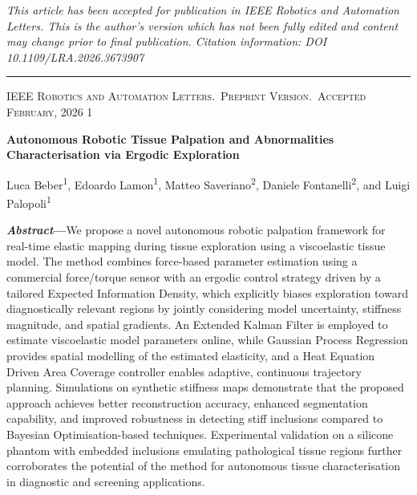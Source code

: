 \documentclass[11pt]{article}
\begin{document}
\begin{center}
{\footnotesize\itshape
This article has been accepted for publication in IEEE Robotics and
Automation Letters. This is the author's version which has not been
fully edited and content may change prior to final publication.
Citation information: DOI 10.1109/LRA.2026.3673907\par}
\end{center}

\vspace{0.4em}
\hrule
\vspace{0.6em}

\noindent
{\footnotesize\scshape IEEE Robotics and Automation Letters.\ Preprint Version.\ Accepted February, 2026 \hfill 1}

\vspace{1.2em}

\begin{center}
{\LARGE\bfseries
Autonomous Robotic Tissue Palpation and Abnormalities\\
Characterisation via Ergodic Exploration\par}
\end{center}

\vspace{0.6em}

\begin{center}
Luca Beber\textsuperscript{1},
Edoardo Lamon\textsuperscript{1},
Matteo Saveriano\textsuperscript{2},
Daniele Fontanelli\textsuperscript{2},
and Luigi Palopoli\textsuperscript{1}
\end{center}

\vspace{1em}

\noindent
\textbf{\textit{Abstract}---}We propose a novel autonomous robotic
palpation framework for real-time elastic mapping during tissue
exploration using a viscoelastic tissue model. The method combines
force-based parameter estimation using a commercial force/torque
sensor with an ergodic control strategy driven by a tailored Expected
Information Density, which explicitly biases exploration toward
diagnostically relevant regions by jointly considering model
uncertainty, stiffness magnitude, and spatial gradients. An Extended
Kalman Filter is employed to estimate viscoelastic model parameters
online, while Gaussian Process Regression provides spatial modelling
of the estimated elasticity, and a Heat Equation Driven Area Coverage
controller enables adaptive, continuous trajectory planning.
Simulations on synthetic stiffness maps demonstrate that the proposed
approach achieves better reconstruction accuracy, enhanced
segmentation capability, and improved robustness in detecting stiff
inclusions compared to Bayesian Optimisation-based techniques.
Experimental validation on a silicone phantom with embedded inclusions
emulating pathological tissue regions further corroborates the
potential of the method for autonomous tissue characterisation in
diagnostic and screening applications.
\end{document}

